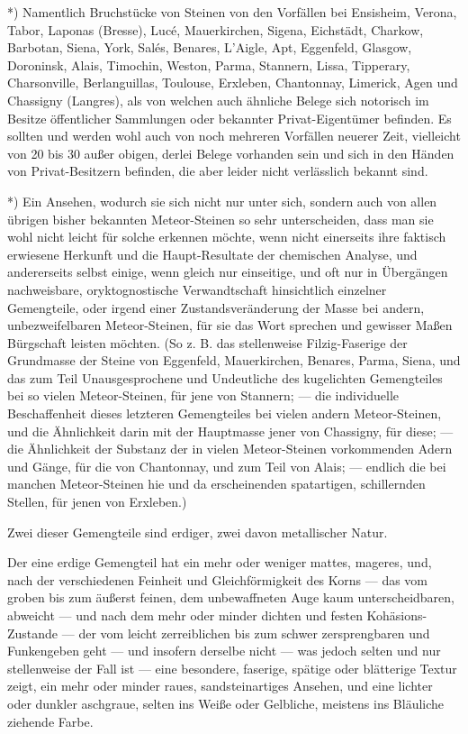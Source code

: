 \documentclass[a4paper, 11pt, oneside, german]{article}
\begin{document}
*) Namentlich Bruchstücke von Steinen von den Vorfällen bei Ensisheim, Verona, Tabor, Laponas (Bresse), Lucé, Mauerkirchen, Sigena, Eichstädt, Charkow, Barbotan, Siena, York, Salés, Benares, L'Aigle, Apt, Eggenfeld, Glasgow, Doroninsk, Alais, Timochin, Weston, Parma, Stannern, Lissa, Tipperary, Charsonville, Berlanguillas, Toulouse, Erxleben, Chantonnay, Limerick, Agen und Chassigny (Langres), als von welchen auch ähnliche Belege sich notorisch im Besitze öffentlicher Sammlungen oder bekannter Privat-Eigentümer befinden. Es sollten und werden wohl auch von noch mehreren Vorfällen neuerer Zeit, vielleicht von 20 bis 30 außer obigen, derlei Belege vorhanden sein und sich in den Händen von Privat-Besitzern befinden, die aber leider nicht verlässlich bekannt sind.

*) Ein Ansehen, wodurch sie sich nicht nur unter sich, sondern auch von allen übrigen bisher bekannten Meteor-Steinen so sehr unterscheiden, dass man sie wohl nicht leicht für solche erkennen möchte, wenn nicht einerseits ihre faktisch erwiesene Herkunft und die Haupt-Resultate der chemischen Analyse, und andererseits selbst einige, wenn gleich nur einseitige, und oft nur in Übergängen nachweisbare, oryktognostische Verwandtschaft hinsichtlich einzelner Gemengteile, oder irgend einer Zustandsveränderung der Masse bei andern, unbezweifelbaren Meteor-Steinen, für sie das Wort sprechen und gewisser Maßen Bürgschaft leisten möchten. (So z. B. das stellenweise Filzig-Faserige der Grundmasse der Steine von Eggenfeld, Mauerkirchen, Benares, Parma, Siena, und das zum Teil Unausgesprochene und Undeutliche des kugelichten Gemengteiles bei so vielen Meteor-Steinen, für jene von Stannern; --- die individuelle Beschaffenheit dieses letzteren Gemengteiles bei vielen andern Meteor-Steinen, und die Ähnlichkeit darin mit der Hauptmasse jener von Chassigny, für diese; --- die Ähnlichkeit der Substanz der in vielen Meteor-Steinen vorkommenden Adern und Gänge, für die von Chantonnay, und zum Teil von Alais; --- endlich die bei manchen Meteor-Steinen hie und da erscheinenden spatartigen, schillernden Stellen, für jenen von Erxleben.)

Zwei dieser Gemengteile sind erdiger, zwei davon metallischer Natur.

Der eine erdige Gemengteil hat ein mehr oder weniger mattes, mageres, und, nach der verschiedenen Feinheit und Gleichförmigkeit des Korns --- das vom groben bis zum äußerst feinen, dem unbewaffneten Auge kaum unterscheidbaren, abweicht --- und nach dem mehr oder minder dichten und festen Kohäsions-Zustande --- der vom leicht zerreiblichen bis zum schwer zersprengbaren und Funkengeben geht --- und insofern derselbe nicht --- was jedoch selten und nur stellenweise der Fall ist --- eine besondere, faserige, spätige oder blätterige Textur zeigt, ein mehr oder minder raues, sandsteinartiges Ansehen, und eine lichter oder dunkler aschgraue, selten ins Weiße oder Gelbliche, meistens ins Bläuliche ziehende Farbe.
\end{document}

